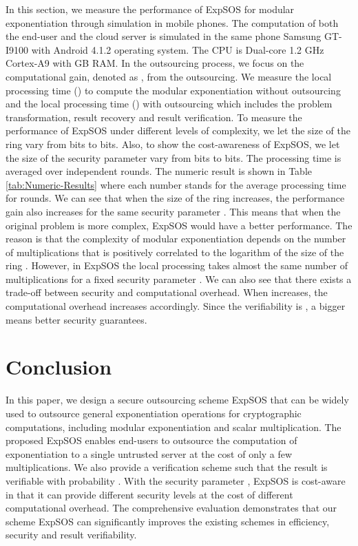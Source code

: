 \documentclass[english,draftcls,onecolumn,11pt]{IEEEtran}
\theoremstyle{definition}
\theoremstyle{plain}
\theoremstyle{plain}
\theoremstyle{definition}
\begin{document}
In this section, we measure the performance of ExpSOS for modular
exponentiation through simulation in mobile phones. The computation
of both the end-user and the cloud server is simulated in the same
phone Samsung GT-I9100 with Android 4.1.2 operating system. The CPU
is Dual-core 1.2 GHz Cortex-A9 with  GB RAM. In the outsourcing
process, we focus on the computational gain, denoted as , from
the outsourcing. We measure the local processing time () to
compute the modular exponentiation  without outsourcing
and the local processing time () with outsourcing which includes
the problem transformation, result recovery and result verification.
To measure the performance of ExpSOS under different levels of complexity,
we let the size of the ring  vary from  bits to 
bits. Also, to show the cost-awareness of ExpSOS, we let the size
of the security parameter  vary from  bits to  bits.
The processing time is averaged over  independent rounds. The
numeric result is shown in Table \ref{tab:Numeric-Results} where
each number stands for the average processing time for  rounds.
We can see that when the size of the ring  increases, the
performance gain  also increases for the same security parameter
. This means that when the original problem is more complex, ExpSOS
would have a better performance. The reason is that the complexity
of modular exponentiation depends on the number of multiplications
that is positively correlated to the logarithm of the size of the
ring . However, in ExpSOS the local processing takes almost
the same number of multiplications for a fixed security parameter
. We can also see that there exists a trade-off between security
and computational overhead. When  increases, the computational
overhead increases accordingly. Since the verifiability is ,
a bigger  means better security guarantees. 


\section{Conclusion\label{sec:Conclusion}}

In this paper, we design a secure outsourcing scheme ExpSOS that can
be widely used to outsource general exponentiation operations for
cryptographic computations, including modular exponentiation and scalar
multiplication. The proposed ExpSOS enables end-users to outsource
the computation of exponentiation to a single untrusted server at
the cost of only a few multiplications. We also provide a verification
scheme such that the result is verifiable with probability .
With the security parameter , ExpSOS is cost-aware in that it
can provide different security levels at the cost of different computational
overhead. The comprehensive evaluation demonstrates that our scheme
ExpSOS can significantly improves the existing schemes in efficiency,
security and result verifiability.
\end{document}
